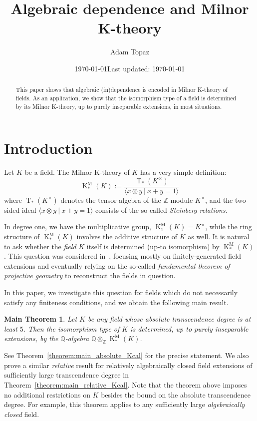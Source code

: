 \documentclass[12pt]{amsart}
\title{Algebraic dependence and Milnor K-theory}
\author{Adam Topaz}
\date{\today}
\date{Last updated: \today}
\newcommand{\KM}{\operatorname{K}^\mathrm{M}}
\newcommand{\T}{\operatorname{T}}
\newcommand{\Zbb}{\mathbb{Z}}
\newcommand{\Qbb}{\mathbb{Q}}
\newtheorem*{maintheorem*}{Main Theorem}
\theoremstyle{definition}
\begin{document}
\maketitle

\begin{abstract}
  This paper shows that algebraic (in)dependence is encoded in Milnor K-theory of fields.
  As an application, we show that the isomorphism type of a field is determined by its Milnor K-theory, up to purely inseparable extensions, in most situations.
\end{abstract}

\setcounter{tocdepth}{1}
\tableofcontents

\section{Introduction}

Let $K$ be a field.
The Milnor K-theory of $K$ has a very simple definition:
\[ \KM_{*}(K) := \frac{\T_{*}(K^{\times})}{ \langle x \otimes y \ | \ x + y = 1 \rangle } \]
where $\T_{*}(K^{\times})$ denotes the tensor algebra of the $\Zbb$-module $K^{\times}$, and the two-sided ideal $\langle x \otimes y \ | \ x + y = 1 \rangle$ consists of the so-called \emph{Steinberg relations}.

In degree one, we have the multiplicative group, $\KM_{1}(K) = K^{\times}$, while the ring structure of $\KM_{*}(K)$ involves the additive structure of $K$ as well.
It is natural to ask whether the \emph{field} $K$ itself is determined (up-to isomorphism) by $\KM_{*}(K)$.
This question was considered in~\cite{zbMATH05635168,zbMATH07463742}, focusing mostly on finitely-generated field extensions and eventually relying on the so-called \emph{fundamental theorem of projective geometry} to reconstruct the fields in question.

In this paper, we investigate this question for fields which do not necessarily satisfy any finiteness conditions, and we obtain the following main result.
\begin{maintheorem*}
  Let $K$ be any field whose absolute transcendence degree is at least $5$.
  Then the isomorphism type of $K$ is determined, up to purely inseparable extensions, by the $\Qbb$-algebra $\Qbb \otimes_{\Zbb} \KM_{*}(K)$.
\end{maintheorem*}
See Theorem~\ref{theorem:main_absolute_Kcal} for the precise statement.
We also prove a similar \emph{relative} result for relatively algebraically closed field extensions of sufficiently large transcendence degree in Theorem~\ref{theorem:main_relative_Kcal}.
Note that the theorem above imposes no additional restrictions on $K$ besides the bound on the absolute transcendence degree.
For example, this theorem applies to any sufficiently large \emph{algebraically closed} field.
\end{document}
